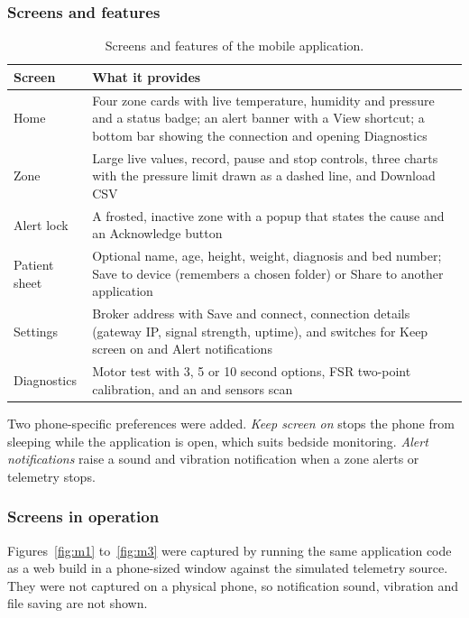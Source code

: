 \subsubsection{Screens and features}
{\small{}
\begin{table}[H]
\centering
\begin{tabularx}{\textwidth}{@{}>{\raggedright\arraybackslash}p{2.7cm}X@{}}
\toprule
\textbf{Screen} & \textbf{What it provides}\\
\midrule
Home & Four zone cards with live temperature, humidity and pressure and a status badge; an alert banner with a View shortcut; a bottom bar showing the connection and opening Diagnostics\\
Zone & Large live values, record, pause and stop controls, three charts with the pressure limit drawn as a dashed line, and Download CSV\\
Alert lock & A frosted, inactive zone with a popup that states the cause and an Acknowledge button\\
Patient sheet & Optional name, age, height, weight, diagnosis and bed number; Save to device (remembers a chosen folder) or Share to another application\\
Settings & Broker address with Save and connect, connection details (gateway IP, signal strength, uptime), and switches for Keep screen on and Alert notifications\\
Diagnostics & Motor test with 3, 5 or 10 second options, FSR two-point calibration, and an \itwoc{} and sensors scan\\
\bottomrule
\end{tabularx}
\caption{Screens and features of the mobile application.}
\end{table}}
Two phone-specific preferences were added. \emph{Keep screen on} stops the phone from sleeping while the application is open, which suits bedside monitoring. \emph{Alert notifications} raise a sound and vibration notification when a zone alerts or telemetry stops.

\subsubsection{Screens in operation}
Figures~\ref{fig:m1} to~\ref{fig:m3} were captured by running the same application code as a web build in a phone-sized window against the simulated telemetry source. They were not captured on a physical phone, so notification sound, vibration and file saving are not shown.


